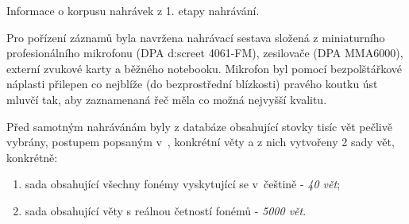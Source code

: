 \begin{table}[htpb]
  \centering
  \def\arraystretch{1.5}
  \caption{Informace o korpusu nahrávek z 1. etapy nahrávání.}
  \label{tab:construction:recording}
\end{table}


Pro pořízení záznamů byla navržena nahrávací sestava složená z miniaturního profesionálního mikrofonu (DPA d:screet 4061-FM), zesilovače (DPA MMA6000), externí zvukové karty a běžného notebooku. Mikrofon byl pomocí bezpolštářkové náplasti přilepen co nejblíže (do bezprostřední blízkosti) pravého koutku úst mluvčí tak, aby zaznamenaná řeč měla co možná nejvyšší kvalitu.


Před samotným nahrávánám byly z databáze obsahující stovky tisíc vět pečlivě vybrány, postupem popsaným v~\cite{Radova2000}, konkrétní věty a z nich vytvořeny 2 sady vět, konkrétně:

\begin{enumerate}
  \item sada obsahující všechny fonémy vyskytující se v~češtině - \textit{40 vět};
  \item sada obsahující věty s reálnou četností fonémů - \textit{5000 vět}.
\end{enumerate}

